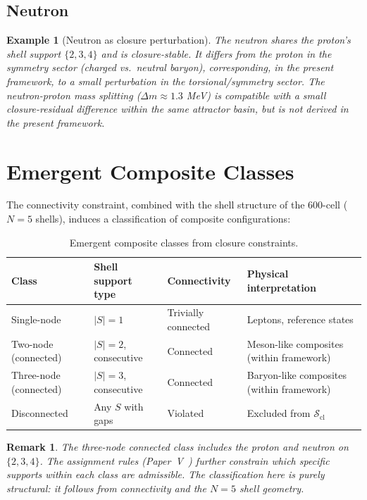 \documentclass[12pt]{article}
\newtheorem{remark}[theorem]{Remark}
\newtheorem{example}[theorem]{Example}
\newcommand{\Scl}{\mathcal{S}_{\mathrm{cl}}}
\begin{document}
\subsection{Neutron}

\begin{example}[Neutron as closure perturbation]\label{ex:neutron}
The neutron shares the proton's shell support $\{2,3,4\}$ and is closure-stable. It differs from the proton in the symmetry sector (charged vs.\ neutral baryon), corresponding, in the present framework, to a small perturbation in the torsional/symmetry sector. The neutron-proton mass splitting ($\Delta m \approx 1.3$ MeV) is compatible with a small closure-residual difference within the same attractor basin, but is not derived in the present framework.
\end{example}

\section{Emergent Composite Classes}\label{sec:classes}

The connectivity constraint, combined with the shell structure of the 600-cell ($N = 5$ shells), induces a classification of composite configurations:

\begin{table}[ht]
\centering
\caption{Emergent composite classes from closure constraints.}
\label{tab:classes}
\begin{tabular}{@{}llll@{}}
\toprule
Class & Shell support type & Connectivity & Physical interpretation \\
\midrule
Single-node & $|S| = 1$ & Trivially connected & Leptons, reference states \\
Two-node (connected) & $|S| = 2$, consecutive & Connected & Meson-like composites (within framework) \\
Three-node (connected) & $|S| = 3$, consecutive & Connected & Baryon-like composites (within framework) \\
Disconnected & Any $S$ with gaps & Violated & Excluded from $\Scl$ \\
\bottomrule
\end{tabular}
\end{table}

\begin{remark}
The three-node connected class includes the proton and neutron on $\{2,3,4\}$. The assignment rules (Paper~V~\citep{SmartV}) further constrain which specific supports within each class are admissible. The classification here is purely structural: it follows from connectivity and the $N = 5$ shell geometry.
\end{remark}
\end{document}
